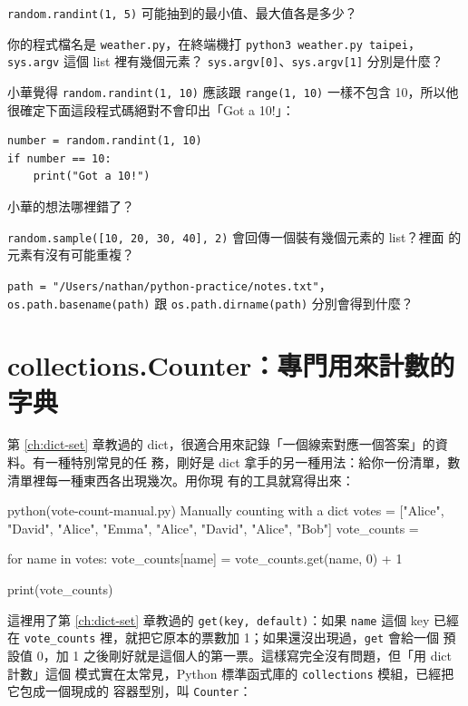 \begin{drills}[label=drills:stdlib-modules]
\item \texttt{random.randint(1, 5)} 可能抽到的最小值、最大值各是多少？
\item 你的程式檔名是 \texttt{weather.py}，在終端機打
\texttt{python3 weather.py taipei}，\texttt{sys.argv} 這個 list 裡有幾個元素？
\texttt{sys.argv[0]}、\texttt{sys.argv[1]} 分別是什麼？
\item 小華覺得 \texttt{random.randint(1, 10)} 應該跟 \texttt{range(1, 10)} 一樣不包含
10，所以他很確定下面這段程式碼絕對不會印出「Got a 10!」：
\begin{verbatim}
number = random.randint(1, 10)
if number == 10:
    print("Got a 10!")
\end{verbatim}
小華的想法哪裡錯了？
\item \texttt{random.sample([10, 20, 30, 40], 2)} 會回傳一個裝有幾個元素的 list？裡面
的元素有沒有可能重複？
\item \texttt{path = "/Users/nathan/python-practice/notes.txt"}，
\texttt{os.path.basename(path)} 跟 \texttt{os.path.dirname(path)} 分別會得到什麼？
\end{drills}

\section{collections.Counter：專門用來計數的字典}
\label{sec:collections-and-itertools}

第 \ref{ch:dict-set} 章教過的 dict，很適合用來記錄「一個線索對應一個答案」的資料。有一種特別常見的任
務，剛好是 dict 拿手的另一種用法：給你一份清單，數清單裡每一種東西各出現幾次。用你現
有的工具就寫得出來：

\begin{example}{python}{(vote-count-manual.py) Manually counting with a dict}
votes = ["Alice", "David", "Alice", "Emma", "Alice", "David", "Alice", "Bob"]
vote_counts = {}

for name in votes:
    vote_counts[name] = vote_counts.get(name, 0) + 1

print(vote_counts)
\end{example}


這裡用了第 \ref{ch:dict-set} 章教過的 \texttt{get(key, default)}：如果 \texttt{name} 這個 key 已經在
\texttt{vote\_counts} 裡，就把它原本的票數加 1；如果還沒出現過，\texttt{get} 會給一個
預設值 0，加 1 之後剛好就是這個人的第一票。這樣寫完全沒有問題，但「用 dict 計數」這個
模式實在太常見，Python 標準函式庫的 \texttt{collections} 模組，已經把它包成一個現成的
容器型別，叫 \texttt{Counter}：

